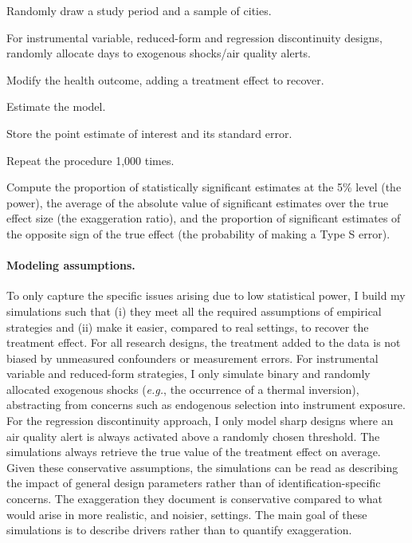\documentclass[12pt]{article}
\begin{document}
        \begin{sloppypar}
        \begin{senumerate}
            \item Randomly draw a study period and a sample of cities.
            \item For instrumental variable, reduced-form and regression discontinuity designs, randomly allocate days to exogenous shocks/air quality alerts.
            \item Modify the health outcome, adding a treatment effect to recover.
            \item Estimate the model.
            \item Store the point estimate of interest and its standard error.
            \item Repeat the procedure 1,000 times.
            \item Compute the proportion of statistically significant estimates at the 5\% level (the power), the average of the absolute value of significant estimates over the true effect size (the exaggeration ratio), and the proportion of significant estimates of the opposite sign of the true effect (the probability of making a Type S error). 
        \end{senumerate}
        \end{sloppypar}
        
        \paragraph{Modeling assumptions.} To only capture the specific issues arising due to low statistical power, I build my simulations such that (i) they meet all the required assumptions of empirical strategies and (ii) make it easier, compared to real settings, to recover the treatment effect. For all research designs, the treatment added to the data is not biased by unmeasured confounders or measurement errors. For instrumental variable and reduced-form strategies, I only simulate binary and randomly allocated exogenous shocks (\textit{e.g.}, the occurrence of a thermal inversion), abstracting from concerns such as endogenous selection into instrument exposure. For the regression discontinuity approach, I only model sharp designs where an air quality alert is always activated above a randomly chosen threshold. The simulations always retrieve the true value of the treatment effect on average. Given these conservative assumptions, the simulations can be read as describing the impact of general design parameters rather than of identification-specific concerns. The exaggeration they document is conservative compared to what would arise in more realistic, and noisier, settings. The main goal of these simulations is to describe drivers rather than to quantify exaggeration.
             
\end{document}
